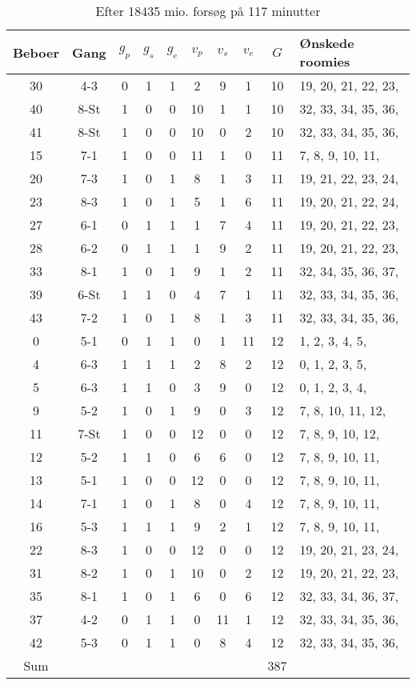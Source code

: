 \documentclass[article,oneside,11pt,a4paper]{memoir}
\newenvironment{assignment}[1]{
\begin{table}[h]
\caption{#1}
\footnotesize
\begin{center}
\begin{tabular}{cccccccccl}
\toprule
Beboer & Gang & $g_p$ & $g_s$ & $g_e$ & $v_p$ & $v_s$ & $v_e$ & $G$ & Ønskede roomies \\ \midrule
}{
\bottomrule
\end{tabular}
\end{center}
\end{table}

}
\begin{document}
\begin{assignment}{Efter 18435 mio. forsøg på 117 minutter}
    30 & 4-3  &   0 &   1 &   1 &   2 &   9 &   1 & 10 &  19, 20, 21, 22, 23, \\
    40 & 8-St &   1 &   0 &   0 &  10 &   1 &   1 & 10 &  32, 33, 34, 35, 36, \\
    41 & 8-St &   1 &   0 &   0 &  10 &   0 &   2 & 10 &  32, 33, 34, 35, 36, \\
    15 & 7-1  &   1 &   0 &   0 &  11 &   1 &   0 & 11 &   7,  8,  9, 10, 11, \\
    20 & 7-3  &   1 &   0 &   1 &   8 &   1 &   3 & 11 &  19, 21, 22, 23, 24, \\
    23 & 8-3  &   1 &   0 &   1 &   5 &   1 &   6 & 11 &  19, 20, 21, 22, 24, \\
    27 & 6-1  &   0 &   1 &   1 &   1 &   7 &   4 & 11 &  19, 20, 21, 22, 23, \\
    28 & 6-2  &   0 &   1 &   1 &   1 &   9 &   2 & 11 &  19, 20, 21, 22, 23, \\
    33 & 8-1  &   1 &   0 &   1 &   9 &   1 &   2 & 11 &  32, 34, 35, 36, 37, \\
    39 & 6-St &   1 &   1 &   0 &   4 &   7 &   1 & 11 &  32, 33, 34, 35, 36, \\
    43 & 7-2  &   1 &   0 &   1 &   8 &   1 &   3 & 11 &  32, 33, 34, 35, 36, \\
     0 & 5-1  &   0 &   1 &   1 &   0 &   1 &  11 & 12 &   1,  2,  3,  4,  5, \\
     4 & 6-3  &   1 &   1 &   1 &   2 &   8 &   2 & 12 &   0,  1,  2,  3,  5, \\
     5 & 6-3  &   1 &   1 &   0 &   3 &   9 &   0 & 12 &   0,  1,  2,  3,  4, \\
     9 & 5-2  &   1 &   0 &   1 &   9 &   0 &   3 & 12 &   7,  8, 10, 11, 12, \\
    11 & 7-St &   1 &   0 &   0 &  12 &   0 &   0 & 12 &   7,  8,  9, 10, 12, \\
    12 & 5-2  &   1 &   1 &   0 &   6 &   6 &   0 & 12 &   7,  8,  9, 10, 11, \\
    13 & 5-1  &   1 &   0 &   0 &  12 &   0 &   0 & 12 &   7,  8,  9, 10, 11, \\
    14 & 7-1  &   1 &   0 &   1 &   8 &   0 &   4 & 12 &   7,  8,  9, 10, 11, \\
    16 & 5-3  &   1 &   1 &   1 &   9 &   2 &   1 & 12 &   7,  8,  9, 10, 11, \\
    22 & 8-3  &   1 &   0 &   0 &  12 &   0 &   0 & 12 &  19, 20, 21, 23, 24, \\
    31 & 8-2  &   1 &   0 &   1 &  10 &   0 &   2 & 12 &  19, 20, 21, 22, 23, \\
    35 & 8-1  &   1 &   0 &   1 &   6 &   0 &   6 & 12 &  32, 33, 34, 36, 37, \\
    37 & 4-2  &   0 &   1 &   1 &   0 &  11 &   1 & 12 &  32, 33, 34, 35, 36, \\
    42 & 5-3  &   0 &   1 &   1 &   0 &   8 &   4 & 12 &  32, 33, 34, 35, 36, \\
Sum &&&&&&&& 387 & \\
\end{assignment}
\end{document}
